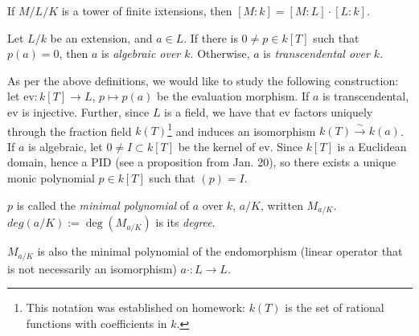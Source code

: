 \begin{cor}
If $M/L/K$ is a tower of finite ixtensions, then $[M : k] = [M : L] \cdot [L : k]$.
\end{cor}

\begin{defn}
Let $L/k$ be an extension, and $a \in L$. If there is $0 \neq p \in k[T]$ such that $p(a) = 0$, then $a$ is \textit{algebraic over $k$}. Otherwise, $a$ is \textit{transcendental over $k$}.
\end{defn}

As per the above definitions, we would like to study the following construction: let $\text{ev} \colon k[T] \rightarrow L$, $p \mapsto p(a)$ be the evaluation morphism. If $a$ is transcendental, ev is injective. Further, since $L$ is a field, we have that ev factors uniquely through the fraction field $k(T)$\footnote{This notation was established on homework: $k(T)$ is the set of rational functions with coefficients in $k$.} and induces an isomorphism $k(T) \stackrel{\sim}{\rightarrow} k(a)$. If $a$ is algebraic, let $0 \neq I \subset k[T]$ be the kernel of ev. Since $k[T]$ is a Euclidean domain, hence a PID (see a proposition from Jan. 20), so there exists a unique monic polynomial $p \in k[T]$ such that $(p) = I$.

\begin{defn}
$p$ is called the \textit{minimal polynomial} of $a$ over $k$, $a/K$, written $M_{a/K}$. $deg(a/K) := \deg(M_{a/K})$ is its \textit{degree}.
\end{defn}

\begin{rmk}
$M_{a/K}$ is also the minimal polynomial of the endomorphism (linear operator that is not necessarily an isomorphism) $a \cdot \colon L \rightarrow L$.
\end{rmk}
